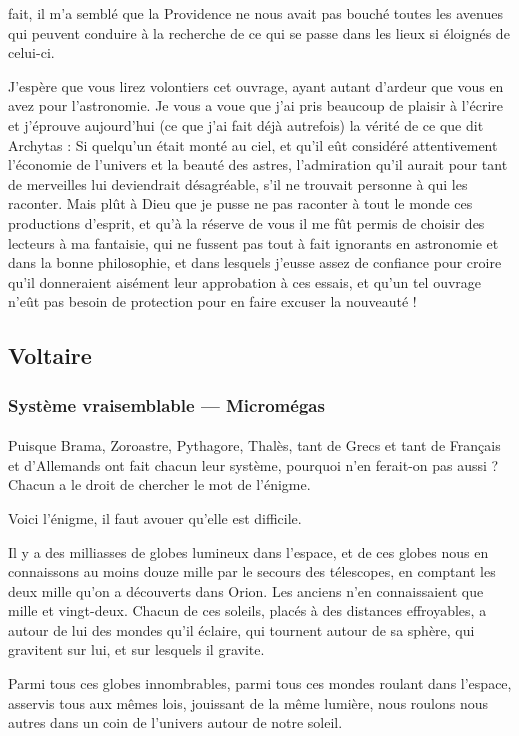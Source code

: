 \documentclass[a4paper, 11pt, oneside, landscape]{article}
\begin{document}
fait, il m'a semblé que la Providence ne nous avait pas bouché toutes les avenues qui peuvent conduire à la recherche de ce qui se passe dans les lieux si éloignés de celui-ci.

J'espère que vous lirez volontiers cet ouvrage, ayant autant d'ardeur que vous en avez pour l'astronomie. Je vous a voue que j'ai pris beaucoup de plaisir à l'écrire et j'éprouve aujourd'hui (ce que j'ai fait déjà autrefois) la vérité de ce que dit Archytas : Si quelqu'un était monté au ciel, et qu'il eût considéré attentivement l'économie de l'univers et la beauté des astres, l'admiration qu'il aurait pour tant de merveilles lui deviendrait désagréable, s'il ne trouvait personne à qui les raconter. Mais plût à Dieu que je pusse ne pas raconter à tout le monde ces productions d'esprit, et qu'à la réserve de vous il me fût permis de choisir des lecteurs à ma fantaisie, qui ne fussent pas tout à fait ignorants en astronomie et dans la bonne philosophie, et dans lesquels j'eusse assez de confiance pour croire qu'il donneraient aisément leur approbation à ces essais, et qu'un tel ouvrage n'eût pas besoin de protection pour en faire excuser la nouveauté !
\clearpage
\subsection{Voltaire}
\subsubsection{Système vraisemblable --- Micromégas}
\paragraph{}
Puisque Brama, Zoroastre, Pythagore, Thalès, tant de Grecs et tant de Français et d'Allemands ont fait chacun leur système, pourquoi n'en ferait-on pas aussi ? Chacun a le droit de chercher le mot de l'énigme.

Voici l'énigme, il faut avouer qu'elle est difficile.

Il y a des milliasses de globes lumineux dans l'espace, et de ces globes nous en connaissons au moins douze mille par le secours des télescopes, en comptant les deux mille qu'on a découverts dans Orion. Les anciens n'en connaissaient que mille et vingt-deux. Chacun de ces soleils, placés à des distances effroyables, a autour de lui des mondes qu'il éclaire, qui tournent autour de sa sphère, qui gravitent sur lui, et sur lesquels il gravite.

Parmi tous ces globes innombrables, parmi tous ces mondes roulant dans l'espace, asservis tous aux mêmes lois, jouissant de la même lumière, nous roulons nous autres dans un coin de l'univers autour de notre soleil.
\end{document}
